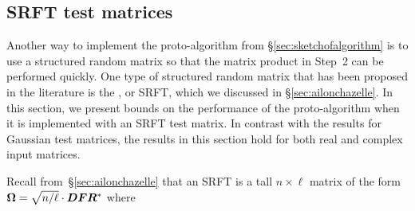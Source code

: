 \documentclass{article}
\begin{document}
\subsection{SRFT test matrices}
\label{sec:SRFTs}

Another way to implement the proto-algorithm from \S\ref{sec:sketchofalgorithm}
is to use a structured random matrix so that the matrix product in Step~2
can be performed quickly.  One type of structured random matrix that has
been proposed in the literature is the ,
or SRFT, which we discussed in \S\ref{sec:ailonchazelle}.
In this section, we present bounds on the performance of the
proto-algorithm when it is implemented with an SRFT test matrix.
In contrast with the results
for Gaussian test matrices, the results in this section hold for both
real and complex input matrices.







Recall from~\S\ref{sec:ailonchazelle} that an SRFT is a
tall $n \times \ell$ matrix of the form $\bm{\Omega} = \sqrt{n/\ell}
\cdot \bm{DFR}^*$ where
\end{document}
